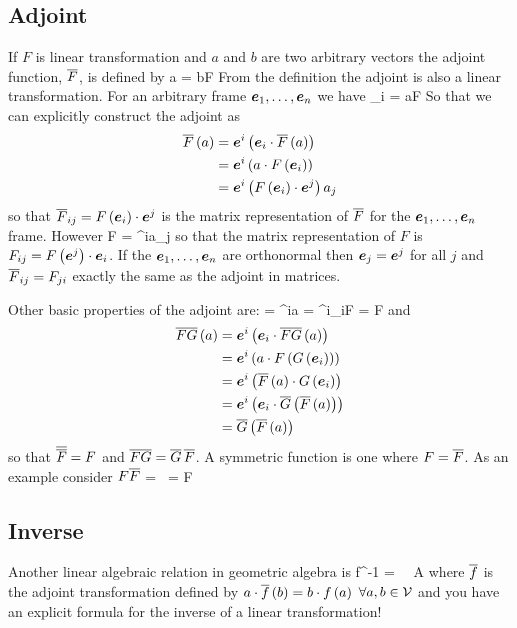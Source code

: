 \subsection{Adjoint}
If $F$ is linear transformation and $a$ and $b$ are two arbitrary vectors the adjoint function, $\overline{F}$, is
defined by
\be
	a\cdot {} = b\cdot F
\ee
From the definition the adjoint is also a linear transformation. For an arbitrary frame $\bm{e}_{1},\dots,\bm{e}_{n}$
we have
\be
	\eb_{i}\cdot {} = a\cdot F
\ee
So that we can explicitly construct the adjoint as
\begin{align}
	\overline{F}\left ( {a} \right ) & = \bm{e}^{i}\left ( {\bm{e}_{i}\cdot \overline{F}\left ( {a} \right )} \right ) \nonumber \\
	            & = \bm{e}^{i}\left ( {a\cdot {F}\left ( {\bm{e}_{i}} \right )} \right ) \nonumber \\
		        & = \bm{e}^{i}\left ( {{F}\left ( {\bm{e}_{i}} \right )\cdot\bm{e}^{j}} \right ) a_{j}
\end{align}
so that $\overline{F}_{ij} = F\left ( {\bm{e}_{i}} \right )\cdot\bm{e}^{j}$ is the matrix representation of $\overline{F}$ for the 
$\bm{e}_{1},\dots,\bm{e}_{n}$ frame. However
\be
	F = \eb^{i}a_{j}
\ee
so that the matrix representation of $F$ is $F_{ij} = F\left ( {\bm{e}^{j}} \right )\cdot\bm{e}_{i}$. If the $\bm{e}_{1},\dots,\bm{e}_{n}$ are
orthonormal then $\bm{e}_{j} = \bm{e}^{j}$ for all $j$ and $\overline{F}_{ij} = F_{ji}$ exactly the same as the adjoint in matrices.

Other basic properties of the adjoint are:
\be
	 = \eb^{i}a\cdot{} = \eb^{i}\eb_{i}\cdot F = F
\ee
and
\begin{align}
	\overline{FG}\left ( {a} \right ) & = \bm{e}^{i}\left ( \bm{e}_{i}\cdot\overline{FG}\left ( {a} \right ) \right ) \nonumber \\
			     & = \bm{e}^{i}\left ( a\cdot{F}\left ( {{G}\left ( {\bm{e}_{i}} \right )} \right ) \right ) \nonumber \\
			     &=  \bm{e}^{i}\left ( \overline{F}\left ( {a} \right )\cdot{G}\left ( {\bm{e}_{i}} \right ) \right ) \nonumber \\
			     &=  \bm{e}^{i}\left ( \bm{e}_{i}\cdot\overline{G}\left ( {\overline{F}\left ( {a} \right )} \right ) \right ) \nonumber \\
			     &=  \overline{G}\left ( {\overline{F}\left ( {a} \right )} \right ) 
\end{align}
so that $\overline{\overline{F}} = F$ and $\overline{FG} = \overline{G}\,\overline{F}$.
A symmetric function is one where $F = \overline{F}$.  As an
example consider $F\overline{F}$
\be
	 = \, = F
\ee
\subsection{Inverse}
Another linear algebraic relation in geometric algebra is
\be
f^{-1} = \ \  \forall A \in \GA{\Vsp}\label{eq1_94}
\ee
where $\overline{f}$ is the adjoint transformation defined by $a\cdot\overline{f}\left ( {b} \right ) = b\cdot{f}\left ( {a} \right )$
 $\forall a,b \in \mathcal{V}$ and you have an explicit formula for the inverse of a linear transformation!

